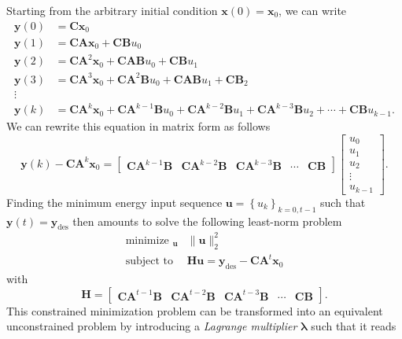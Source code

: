\documentclass[12pt, answers]{exam}
\DeclareMathOperator*{\minimize}{minimize~}
\DeclareMathOperator*{\subjectto}{subject~to~}
\begin{document}
\begin{questions}
\begin{parts}
    \begin{solution}
      {\color{blue}
        Starting from the arbitrary initial condition $\bm{x}(0) = \bm{x}_0$, we can write
          \[
          \begin{aligned}
            \bm{y}(0) & = \bm{Cx}_0 \\
            \bm{y}(1) & = \bm{CAx}_0 + \bm{CB}u_0 \\
            \bm{y}(2) & = \bm{CA}^2\bm{x}_0 + \bm{CAB}u_0 + \bm{CB}u_1 \\
            \bm{y}(3) & = \bm{CA}^3\bm{x}_0 + \bm{CA}^2\bm{B}u_0 + \bm{CAB}u_1 + \bm{CB}_2 \\
            \vdots \\
            \bm{y}(k) & = \bm{CA}^k \bm{x}_0 + \bm{CA}^{k-1} \bm{B}u_0 + \bm{CA}^{k-2}\bm{B}u_1 + \bm{CA}^{k-3} \bm{B} u_2 + \cdots + \bm{CB}u_{k-1}.
          \end{aligned}
          \]
          We can rewrite this equation in matrix form as follows
          \[
          \bm{y}(k) - \bm{CA}^k \bm{x}_0 = \begin{bmatrix} \bm{CA}^{k-1} \bm{B} & \bm{CA}^{k-2} \bm{B} & \bm{CA}^{k-3} \bm{B} & \cdots & \bm{CB} \end{bmatrix} \begin{bmatrix} u_0 \\ u_1 \\ u_2 \\ \vdots \\ u_{k-1} \end{bmatrix}.
          \]
          Finding the minimum energy input sequence $\bm{u} = \left\{ u_k \right\}_{k=0, t-1}$ such that $\bm{y}(t) = \bm{y}_{\text{des}}$ then amounts to solve the following least-norm problem
          \[
          \begin{aligned}
            \minimize_{\bm{u}} & \| \bm{u} \|^2_2 \\
            \subjectto & \bm{Hu} = \bm{y}_{\text{des}} - \bm{CA}^{t} \bm{x}_0
          \end{aligned}
          \]
          with
          \[
          \bm{H} = \begin{bmatrix} \bm{CA}^{t-1} \bm{B} & \bm{CA}^{t-2} \bm{B} & \bm{CA}^{t-3} \bm{B} & \cdots & \bm{CB} \end{bmatrix}.
          \]
          This constrained minimization problem can be transformed into an equivalent unconstrained problem by introducing a \emph{Lagrange multiplier} $\boldsymbol{\lambda}$ such that it reads
}
\end{solution}
\end{parts}
\end{questions}
\end{document}
